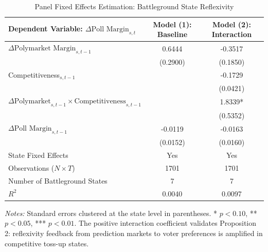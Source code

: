 \begin{table}[htbp]
\centering
\caption{Panel Fixed Effects Estimation: Battleground State Reflexivity}
\label{tab:panel_fe}
\begin{tabular}{lcc}
\hline\hline
Dependent Variable: $\Delta \text{Poll Margin}_{s,t}$ & Model (1): Baseline & Model (2): Interaction \\
\hline
$\Delta \text{Polymarket Margin}_{s,t-1}$ & 0.6444 & -0.3517 \\
 & (0.2900) & (0.1850) \\
Competitiveness$_{s,t-1}$ & & -0.1729 \\
 & & (0.0421) \\
$\Delta \text{Polymarket}_{s,t-1} \times \text{Competitiveness}_{s,t-1}$ & & 1.8339* \\
 & & (0.5352) \\
$\Delta \text{Poll Margin}_{s,t-1}$ & -0.0119 & -0.0163 \\
 & (0.0152) & (0.0160) \\
\hline
State Fixed Effects & Yes & Yes \\
Observations ($N \times T$) & 1701 & 1701 \\
Number of Battleground States & 7 & 7 \\
$R^2$ & 0.0040 & 0.0097 \\
\hline\hline
\end{tabular}
\begin{minipage}{0.95\textwidth}
\vspace{1ex}
\footnotesize
\textit{Notes:} Standard errors clustered at the state level in parentheses. * $p < 0.10$, ** $p < 0.05$, *** $p < 0.01$. The positive interaction coefficient validates Proposition 2: reflexivity feedback from prediction markets to voter preferences is amplified in competitive toss-up states.
\end{minipage}
\end{table}

